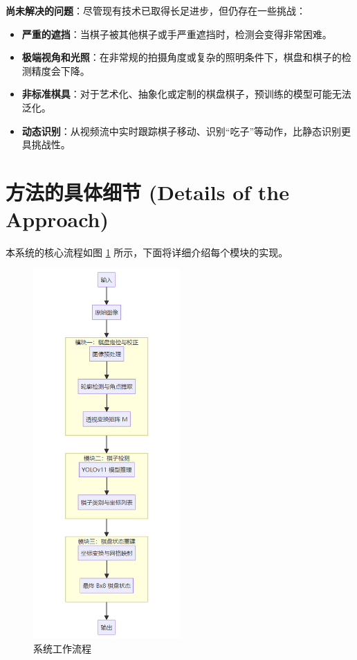 \documentclass[12pt, a4paper]{article}
\begin{document}
\textbf{尚未解决的问题}：尽管现有技术已取得长足进步，但仍存在一些挑战：
\begin{itemize}
    \item \textbf{严重的遮挡}：当棋子被其他棋子或手严重遮挡时，检测会变得非常困难。
    \item \textbf{极端视角和光照}：在非常规的拍摄角度或复杂的照明条件下，棋盘和棋子的检测精度会下降。
    \item \textbf{非标准棋具}：对于艺术化、抽象化或定制的棋盘棋子，预训练的模型可能无法泛化。
    \item \textbf{动态识别}：从视频流中实时跟踪棋子移动、识别“吃子”等动作，比静态识别更具挑战性。
\end{itemize}

\section{方法的具体细节 (Details of the Approach)}
本系统的核心流程如图 \ref{fig:pipeline} 所示，下面将详细介绍每个模块的实现。

\begin{figure}[h!]
    \centering
    \includegraphics[width=0.5\textwidth]{image/workflow.png} 
    \caption{系统工作流程}
    \label{fig:pipeline}
\end{figure}
\end{document}
